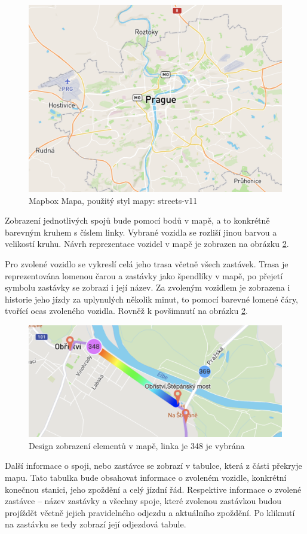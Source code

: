 \begin{figure}
\centering
  \includegraphics[width=0.5\linewidth]{../img/mapa_mapbox.png}
  \caption{Mapbox Mapa, použitý styl mapy: streets-v11}
  \label{fig:mapbox_mapa}
\end{figure}


Zobrazení jednotlivých spojů bude pomocí bodů v mapě, a to konkrétně barevným kruhem s číslem linky. Vybrané vozidla se rozliší jinou barvou a velikostí kruhu. Návrh reprezentace vozidel v mapě je zobrazen na obrázku \ref{fig:dve_vozidla}.


\bigbreak


Pro zvolené vozidlo se vykreslí celá jeho trasa včetně všech zastávek. Trasa je reprezentována lomenou čarou a zastávky jako špendlíky v mapě, po přejetí symbolu zastávky se zobrazí i její název. Za zvoleným vozidlem je zobrazena i historie jeho jízdy za uplynulých několik minut, to pomocí barevné lomené čáry, tvořící ocas zvoleného vozidla. Rovněž k povšimnutí na obrázku \ref{fig:dve_vozidla}.


\begin{figure}
\centering
  \includegraphics[width=0.5\linewidth]{../img/dve_vozidla.png}
  \caption{Design zobrazení elementů v mapě, linka je 348 je vybrána}
  \label{fig:dve_vozidla}
\end{figure}


Další informace o spoji, nebo zastávce se zobrazí v tabulce, která z části překryje mapu. Tato tabulka bude obsahovat informace o zvoleném vozidle, konkrétní konečnou stanici, jeho zpoždění a celý jízdní řád. Respektive informace o zvolené zastávce – název zastávky a všechny spoje, které zvolenou zastávkou budou projíždět včetně jejich pravidelného odjezdu a aktuálního zpoždění. Po kliknutí na zastávku se tedy zobrazí její odjezdová tabule.
